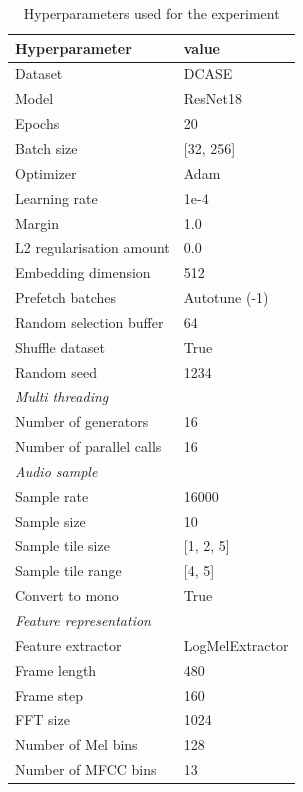 \documentclass[twocolumn]{article}
\begin{document}
\begin{table}[H]
    \centering
    \caption{Hyperparameters used for the experiment}
	\label{tab:Hyperparameters}
    \begin{tabular}{l|l}
        \toprule
        \textbf{Hyperparameter} & \textbf{value} \\ 
        \midrule[1pt]
        Dataset & DCASE \\
        \hline
        Model & ResNet18 \\ 
        \hline
        Epochs & 20 \\ 
        \hline
        Batch size & [32, 256] \\ 
        \hline
        Optimizer & Adam \\ 
        \hline
        Learning rate & 1e-4 \\
        \hline
        Margin & 1.0 \\
        \hline
        L2 regularisation amount & 0.0 \\
        \hline
        Embedding dimension & 512 \\
        \hline
        Prefetch batches & Autotune (-1) \\ 
        \hline
        Random selection buffer & 64 \\ 
        \hline
        Shuffle dataset & True \\
        \hline
        Random seed & 1234 \\
        \midrule[1pt]
        \multicolumn{2}{l}{\textit{Multi threading}} \\
        \midrule[1pt]
        Number of generators & 16 \\ 
        \hline
        Number of parallel calls & 16 \\
        \midrule[1pt]
        \multicolumn{2}{l}{\textit{Audio sample}} \\
        \midrule[1pt]
        Sample rate & 16000 \\ 
        \hline
        Sample size & 10 \\
        \hline
        Sample tile size & [1, 2, 5] \\
        \hline
        Sample tile range & [4, 5] \\
        \hline
        Convert to mono & True \\
        \midrule[1pt]
        \multicolumn{2}{l}{\textit{Feature representation}} \\
        \midrule[1pt]
        Feature extractor & LogMelExtractor \\ 
        \hline
        Frame length & 480 \\
        \hline
        Frame step & 160 \\
        \hline
        FFT size & 1024 \\
        \hline
        Number of Mel bins & 128 \\
        \hline
        Number of MFCC bins & 13 \\
        \bottomrule
    \end{tabular}
\end{table}
\end{document}

